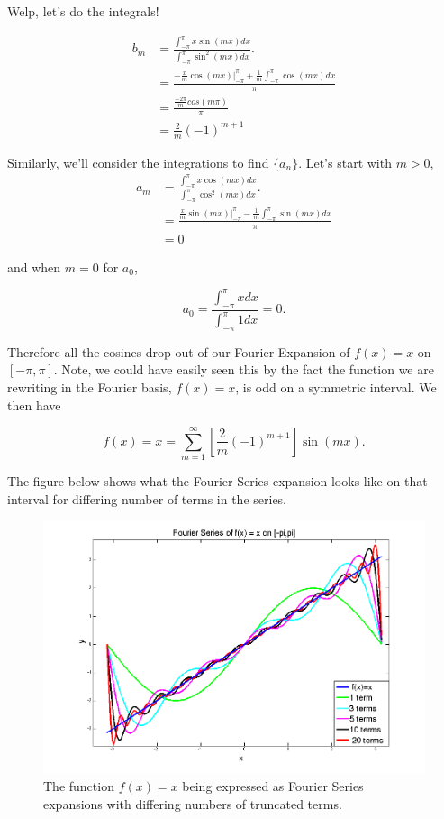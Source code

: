 Welp, let's do the integrals!

\begin{align*}
b_m &= \frac{ \int_{-\pi}^{\pi} x \sin(mx) dx }{  \int_{-\pi}^{\pi} \sin^2(mx) dx }. \\
&= \frac{ -\frac{x}{m}\cos(mx) \Big|_{-\pi}^{\pi} + \frac{1}{m}\int_{-\pi}^{\pi} \cos(mx) dx }{\pi} \\
&= \frac{ \frac{-2\pi}{m} cos(m\pi) }{\pi} \\
& = \frac{2}{m} (-1)^{m+1}
\end{align*}

Similarly, we'll consider the integrations to find $\{ a_n \}$. Let's start with $m>0$,
\begin{align*}
a_m &= \frac{ \int_{-\pi}^{\pi} x \cos(mx) dx }{  \int_{-\pi}^{\pi} \cos^2(mx) dx }. \\
&= \frac{ \frac{x}{m}\sin(mx) \Big|_{-\pi}^{\pi} - \frac{1}{m}\int_{-\pi}^{\pi} \sin(mx) dx }{\pi} \\
&= 0
\end{align*}

and when $m=0$ for $a_0$,

$$a_0 = \frac{ \int_{-\pi}^{\pi} x dx }{ \int_{-\pi}^{\pi} 1 dx } = 0.$$

Therefore all the cosines drop out of our Fourier Expansion of $f(x)=x$ on $[-\pi,\pi].$ Note, we could have easily seen this by the fact the function we are rewriting in the Fourier basis, $f(x)=x$, is odd on a symmetric interval.  We then have

$$f(x) = x = \sum_{m=1}^{\infty} \left[ \frac{2}{m} (-1)^{m+1}\right] \sin(mx).$$

The figure below shows what the Fourier Series expansion looks like on that interval for differing number of terms in the series.

\begin{center}
\begin{figure}[h!]
 	\centering
  	\includegraphics[scale=0.5]{Fourier_Series_Ex.png}
 	\caption{The function $f(x)=x$ being expressed as Fourier Series expansions with differing numbers of truncated terms.}
 	\label{Fourier_Series_Ex}
\end{figure}
\end{center}


